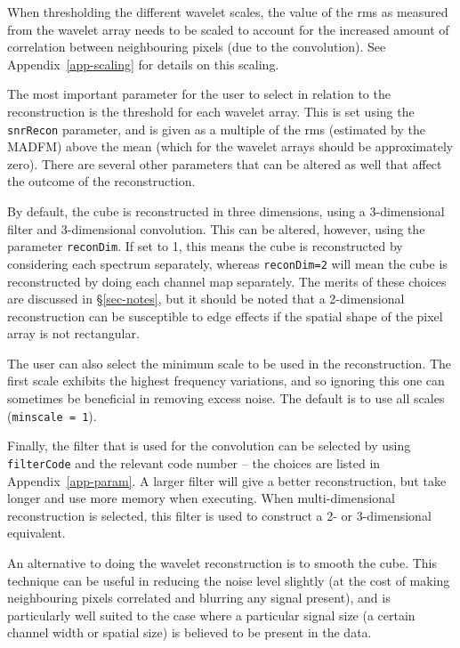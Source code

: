 When thresholding the different wavelet scales, the value of the rms
as measured from the wavelet array needs to be scaled to account for
the increased amount of correlation between neighbouring pixels (due
to the convolution). See Appendix~\ref{app-scaling} for details on
this scaling.


The most important parameter for the user to select in relation to the
reconstruction is the threshold for each wavelet array. This is set
using the \texttt{snrRecon} parameter, and is given as a multiple of
the rms (estimated by the MADFM) above the mean (which for the wavelet
arrays should be approximately zero). There are several other
parameters that can be altered as well that affect the outcome of the
reconstruction.

By default, the cube is reconstructed in three dimensions, using a
3-dimensional filter and 3-dimensional convolution. This can be
altered, however, using the parameter \texttt{reconDim}. If set to 1,
this means the cube is reconstructed by considering each spectrum
separately, whereas \texttt{reconDim=2} will mean the cube is
reconstructed by doing each channel map separately. The merits of
these choices are discussed in \S\ref{sec-notes}, but it should be
noted that a 2-dimensional reconstruction can be susceptible to edge
effects if the spatial shape of the pixel array is not rectangular.

The user can also select the minimum scale to be used in the
reconstruction. The first scale exhibits the highest frequency
variations, and so ignoring this one can sometimes be beneficial in
removing excess noise. The default is to use all scales
(\texttt{minscale = 1}).

Finally, the filter that is used for the convolution can be selected
by using \texttt{filterCode} and the relevant code number -- the
choices are listed in Appendix~\ref{app-param}. A larger filter will
give a better reconstruction, but take longer and use more memory when
executing. When multi-dimensional reconstruction is selected, this
filter is used to construct a 2- or 3-dimensional equivalent.

\label{sec-smoothing}

An alternative to doing the wavelet reconstruction is to smooth the
cube.  This technique can be useful in reducing the noise level
slightly (at the cost of making neighbouring pixels correlated and
blurring any signal present), and is particularly well suited to the
case where a particular signal size (\ie a certain channel width or
spatial size) is believed to be present in the data.

